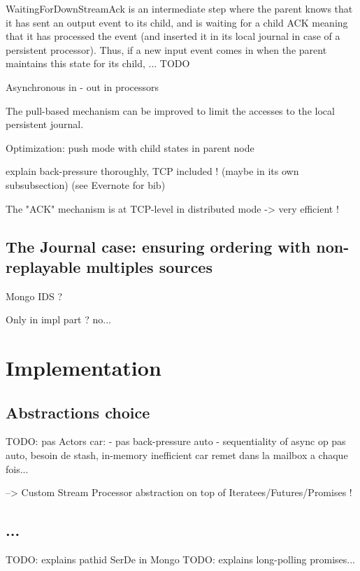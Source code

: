 WaitingForDownStreamAck is an intermediate step where the parent knows that it has sent an output event to its child, and is waiting for a child ACK meaning that it has
processed the event (and inserted it in its local journal in case of a persistent processor). Thus, if a new input event comes in when the parent maintains this state
for its child, ... TODO



Asynchronous in - out in processors

The pull-based mechanism can be improved to limit the accesses to the local persistent journal.


Optimization: push mode with child states in parent node

explain back-pressure thoroughly, TCP included ! (maybe in its own subsubsection) (see Evernote for bib)

The "ACK" mechanism is at TCP-level in distributed mode -> very efficient !


\subsection{The Journal case: ensuring ordering with non-replayable multiples sources}

Mongo IDS ?

Only in impl part ? no...



\section{Implementation}
\label{sec:streamimplementation}

\subsection{Abstractions choice}

TODO: pas Actors car:
- pas back-pressure auto
- sequentiality of async op pas auto, besoin de stash, in-memory inefficient car remet dans la mailbox a chaque fois...

--> Custom Stream Processor abstraction on top of Iteratees/Futures/Promises !

\subsection{...}

TODO: explains pathid SerDe in Mongo
TODO: explains long-polling promises...

